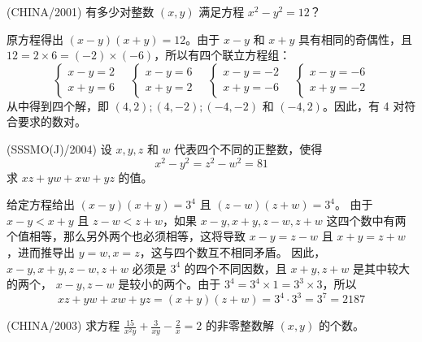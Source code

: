 \begin{questions}
\question (CHINA/2001) 有多少对整数 $(x,y)$ 满足方程 $x^2-y^2=12$？

\begin{solution}
原方程得出 $(x-y)(x+y)=12$。由于 $x-y$ 和 $x+y$ 具有相同的奇偶性，且 $12=2 \times 6=(-2) \times (-6)$，所以有四个联立方程组：
\[
\begin{cases} x-y=2 \\ x+y=6 \end{cases} \quad \begin{cases} x-y=6 \\ x+y=2 \end{cases} \quad \begin{cases} x-y=-2 \\ x+y=-6 \end{cases} \quad \begin{cases} x-y=-6 \\ x+y=-2 \end{cases}
\]
从中得到四个解，即 $(4,2); (4,-2); (-4,-2)$ 和 $(-4,2)$。因此，有 4 对符合要求的数对。
\end{solution}

\question (SSSMO(J)/2004) 设 $x, y, z$ 和 $w$ 代表四个不同的正整数，使得
\[
x^2-y^2=z^2-w^2=81
\]
求 $xz+yw+xw+yz$ 的值。

\begin{solution}
给定方程给出 $(x-y)(x+y)=3^4$ 且 $(z-w)(z+w)=3^4$。
由于 $x-y < x+y$ 且 $z-w < z+w$，如果 $x-y, x+y, z-w, z+w$ 这四个数中有两个值相等，那么另外两个也必须相等，这将导致 $x-y=z-w$ 且 $x+y=z+w$，进而推导出 $y=w, x=z$，这与四个数互不相同矛盾。
因此，$x-y, x+y, z-w, z+w$ 必须是 $3^4$ 的四个不同因数，且 $x+y, z+w$ 是其中较大的两个， $x-y, z-w$ 是较小的两个。由于 $3^4=3^4 \times 1 = 3^3 \times 3$，所以
\[
xz+yw+xw+yz=(x+y)(z+w)=3^4 \cdot 3^3 = 3^7 = 2187
\]
\end{solution}

\question (CHINA/2003) 求方程 $\frac{15}{x^2y}+\frac{3}{xy}-\frac{2}{x}=2$ 的非零整数解 $(x,y)$ 的个数。


\end{questions}
